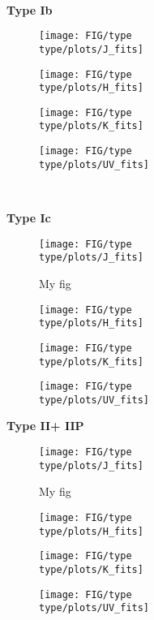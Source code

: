 
\ 

\renewcommand{\type}{Ib}
\textbf{Type \type}
\begin{figure}[H]
\texttt{[image: FIG/type\\type/plots/J\_fits]}
\end{figure}
\begin{figure}[H]
\centering
\texttt{[image: FIG/type\\type/plots/H\_fits]}
\end{figure}
\begin{figure}[H]
\centering
\texttt{[image: FIG/type\\type/plots/K\_fits]}
\end{figure}
\begin{figure}[H]
\centering
\texttt{[image: FIG/type\\type/plots/UV\_fits]}
\end{figure}

\pagebreak
\renewcommand{\type}{Ic}

\

\textbf{Type \type}
\begin{figure}[H]
\texttt{[image: FIG/type\\type/plots/J\_fits]}
\caption{\label{fig:FIG/typeIb/J_fits} My fig}
\end{figure}
\begin{figure}[H]
\centering
\texttt{[image: FIG/type\\type/plots/H\_fits]}
\end{figure}
\begin{figure}[H]
\centering
\texttt{[image: FIG/type\\type/plots/K\_fits]}
\end{figure}
\begin{figure}[H]
\centering
\texttt{[image: FIG/type\\type/plots/UV\_fits]}
\end{figure}
\pagebreak
\renewcommand{\type}{II}
\textbf{Type \type + IIP}
\begin{figure}[H]
\texttt{[image: FIG/type\\type/plots/J\_fits]}
\caption{\label{fig:FIG/typeIb/J_fits} My fig}
\end{figure}
\begin{figure}[H]
\centering
\texttt{[image: FIG/type\\type/plots/H\_fits]}
\end{figure}
\begin{figure}[H]
\centering
\texttt{[image: FIG/type\\type/plots/K\_fits]}
\end{figure}
\begin{figure}[H]
\centering
\texttt{[image: FIG/type\\type/plots/UV\_fits]}
\end{figure}
\pagebreak

